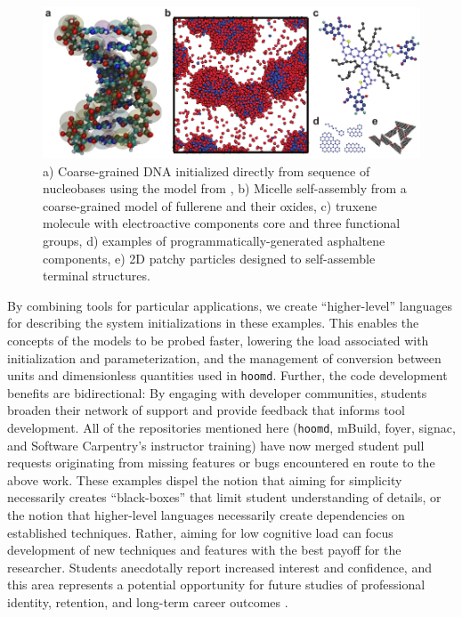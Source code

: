 \begin{figure}
    \centering
    \includegraphics[width=6in]{figures/pub4/mBuild.pdf}
    \caption[a) Coarse-grained DNA initialized directly from sequence of nucleobases using the model from Knotts, b) Micelle self-assembly from a coarse-grained model of fullerene and their oxides, c) truxene molecule with electroactive components core and three functional groups, d) examples of programmatically-generated asphaltene components, e) 2D patchy particles designed to self-assemble terminal structures.]{a) Coarse-grained DNA initialized directly from sequence of nucleobases using the model from \cite{Knotts2007}, b) Micelle self-assembly from a coarse-grained model of fullerene and their oxides, c) truxene molecule with electroactive components core and three functional groups, d) examples of programmatically-generated asphaltene components, e) 2D patchy particles designed to self-assemble terminal structures.}\label{fig:mbuild} %
\end{figure}

By combining tools for particular applications, we create ``higher-level'' languages for describing the system initializations in these examples.
This enables the concepts of the models to be probed faster, lowering the load associated with initialization and parameterization, and the management of conversion between units and dimensionless quantities used in \texttt{hoomd}. 
Further, the code development benefits are bidirectional: By engaging with developer communities, students broaden their network of support and provide feedback that informs tool development.
All of the repositories mentioned here (\texttt{hoomd}, mBuild, foyer, signac, and Software Carpentry's instructor training) have now merged student pull requests originating from missing features or bugs encountered en route to the above work.
These examples dispel the notion that aiming for simplicity necessarily creates ``black-boxes'' that limit student understanding of details, or the notion that higher-level languages necessarily create dependencies on established techniques.
Rather, aiming for low cognitive load can focus development of new techniques and features with the best payoff for the researcher.
Students anecdotally report increased interest and confidence, and this area represents a potential opportunity for future studies of professional identity, retention, and long-term career outcomes \cite{Ibarra1999}.

